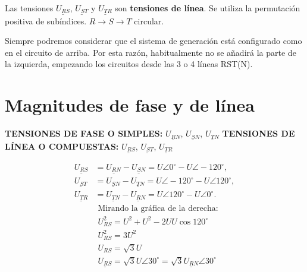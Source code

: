 \documentclass{article}
\begin{document}
\begin{flushleft}
Las tensiones $\underline{U_{RS}}$, $\underline{U_{ST}}$ y $\underline{U_{TR}}$ son \textbf{tensiones de línea}. Se utiliza la permutación positiva de subíndices. $R \to S \to T$ circular. \newline

    Siempre podremos considerar que el sistema de generación está configurado como en el circuito de arriba. Por esta razón, habitualmente no se añadirá la parte de la izquierda, empezando los circuitos desde las 3 o 4 líneas RST(N).
\end{flushleft}

\section{Magnitudes de fase y de línea}
\begin{flushleft}
\textbf{TENSIONES DE FASE O SIMPLES: } $\underline{U_{RN}}$, $\underline{U_{SN}}$, $\underline{U_{TN}}$ \newline
\textbf{TENSIONES DE LÍNEA O COMPUESTAS: } $\underline{U_{RS}}$, $\underline{U_{ST}}$, $\underline{U_{TR}}$
\end{flushleft}
\begin{minipage}{0.45\textwidth}
    \centering
\begin{align*}
    \underline{U_{RS}} & = \underline{U_{RN}} - \underline{U_{SN}} = U \angle 0^\circ - U \angle -120^\circ, \\
    \underline{U_{ST}} & = \underline{U_{SN}} - \underline{U_{TN}} = U \angle -120^\circ - U \angle 120^\circ, \\
    \underline{U_{TR}} & = \underline{U_{TN}} - \underline{U_{RN}} = U \angle 120^\circ - U \angle 0^\circ.
\end{align*}
\begin{align*}
& \text{Mirando la gráfica de la derecha:} \\
& U_{RS}^2 = U^{2} + U^{2} - 2 U U \cos 120^\circ \\
& U_{RS}^2 = 3 U^{2} \\
& U_{RS}  = \sqrt{3} U \\
& \underline{U_{RS}} = \sqrt{3} U \angle 30^\circ = \sqrt{3} \underline{U_{RN}} \angle 30^\circ
\end{align*}
\end{minipage}
\hspace{1cm}
\end{document}
